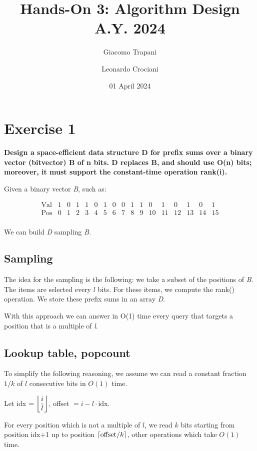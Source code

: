 \documentclass{article}
\title{Hands-On 3: Algorithm Design A.Y. 2024}
\author{Giacomo Trapani \and Leonardo Crociani}
\date{01 April 2024}
\DeclarePairedDelimiter\ceil{\lceil}{\rceil}
\DeclarePairedDelimiter\floor{\lfloor}{\rfloor}
\begin{document}
\maketitle


\section{Exercise 1}
\textbf{ Design a space-efficient data structure D for prefix sums over a binary vector (bitvector) B of n bits. D replaces B, and should use O(n) bits; moreover, it must support the constant-time operation rank(i).}

Given a binary vector \textit{B}, such as:

{
\scriptsize
\[
\begin{array}{*{17}{c}}
\text{Val} & 1 & 0 & 1 & 1 & 0 & 1 & 0 & 0 & 1 & 1 & 0 & 1 & 0 & 1 & 0 & 1\\
\text{Pos} & 0 & 1 & 2 & 3 & 4 & 5 & 6 & 7 & 8 & 9 & 10 & 11 & 12 & 13 & 14 & 15 \\
\end{array}
\]
}

\noindent We can build \textit{D} sampling \textit{B}.

\subsection{Sampling}

The idea for the sampling is the following: we take a subset of the positions of \textit{B}. The items are selected every \(l\) bits. For these items, we compute the rank() operation. We store these prefix sums in an array \textit{D}.
 

With this approach we can answer in O(1) time every query that targets a position that is a multiple of \textit{l}.

\subsection{Lookup table, popcount}
To simplify the following reasoning, we assume we can read a constant fraction \(1/k\) of \(l\) consecutive
bits in \(O(1)\) time.

Let idx \( = \floor*{\dfrac{i}{l}}\), offset \( = i - l\cdot \text{idx}\).

For every position which is not a multiple of \(l\), we read \(k\) bits starting from position idx+1 up
to position \(\ceil*{\text{offset}/k}\), other operations which take \(O(1)\) time.
\end{document}
